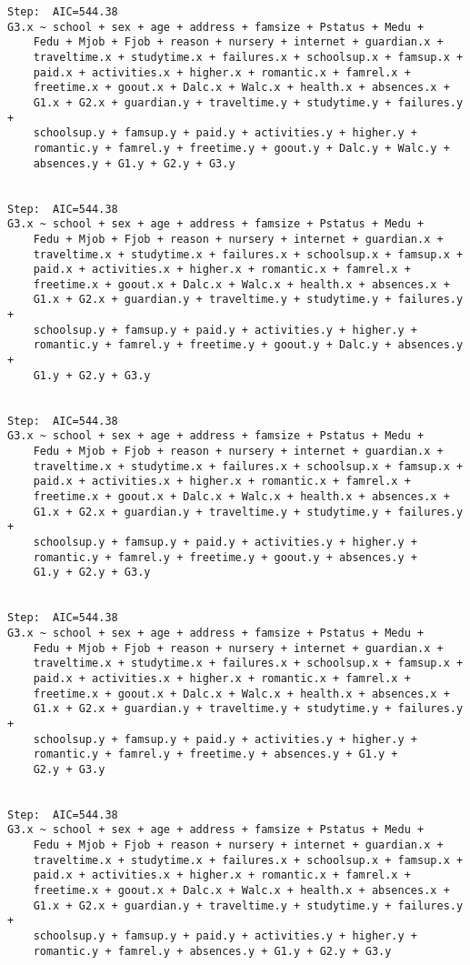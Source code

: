 \documentclass[11pt]{article}
\begin{document}
\begin{enumerate}
\begin{verbatim}
Step:  AIC=544.38
G3.x ~ school + sex + age + address + famsize + Pstatus + Medu + 
    Fedu + Mjob + Fjob + reason + nursery + internet + guardian.x + 
    traveltime.x + studytime.x + failures.x + schoolsup.x + famsup.x + 
    paid.x + activities.x + higher.x + romantic.x + famrel.x + 
    freetime.x + goout.x + Dalc.x + Walc.x + health.x + absences.x + 
    G1.x + G2.x + guardian.y + traveltime.y + studytime.y + failures.y + 
    schoolsup.y + famsup.y + paid.y + activities.y + higher.y + 
    romantic.y + famrel.y + freetime.y + goout.y + Dalc.y + Walc.y + 
    absences.y + G1.y + G2.y + G3.y


Step:  AIC=544.38
G3.x ~ school + sex + age + address + famsize + Pstatus + Medu + 
    Fedu + Mjob + Fjob + reason + nursery + internet + guardian.x + 
    traveltime.x + studytime.x + failures.x + schoolsup.x + famsup.x + 
    paid.x + activities.x + higher.x + romantic.x + famrel.x + 
    freetime.x + goout.x + Dalc.x + Walc.x + health.x + absences.x + 
    G1.x + G2.x + guardian.y + traveltime.y + studytime.y + failures.y + 
    schoolsup.y + famsup.y + paid.y + activities.y + higher.y + 
    romantic.y + famrel.y + freetime.y + goout.y + Dalc.y + absences.y + 
    G1.y + G2.y + G3.y


Step:  AIC=544.38
G3.x ~ school + sex + age + address + famsize + Pstatus + Medu + 
    Fedu + Mjob + Fjob + reason + nursery + internet + guardian.x + 
    traveltime.x + studytime.x + failures.x + schoolsup.x + famsup.x + 
    paid.x + activities.x + higher.x + romantic.x + famrel.x + 
    freetime.x + goout.x + Dalc.x + Walc.x + health.x + absences.x + 
    G1.x + G2.x + guardian.y + traveltime.y + studytime.y + failures.y + 
    schoolsup.y + famsup.y + paid.y + activities.y + higher.y + 
    romantic.y + famrel.y + freetime.y + goout.y + absences.y + 
    G1.y + G2.y + G3.y


Step:  AIC=544.38
G3.x ~ school + sex + age + address + famsize + Pstatus + Medu + 
    Fedu + Mjob + Fjob + reason + nursery + internet + guardian.x + 
    traveltime.x + studytime.x + failures.x + schoolsup.x + famsup.x + 
    paid.x + activities.x + higher.x + romantic.x + famrel.x + 
    freetime.x + goout.x + Dalc.x + Walc.x + health.x + absences.x + 
    G1.x + G2.x + guardian.y + traveltime.y + studytime.y + failures.y + 
    schoolsup.y + famsup.y + paid.y + activities.y + higher.y + 
    romantic.y + famrel.y + freetime.y + absences.y + G1.y + 
    G2.y + G3.y


Step:  AIC=544.38
G3.x ~ school + sex + age + address + famsize + Pstatus + Medu + 
    Fedu + Mjob + Fjob + reason + nursery + internet + guardian.x + 
    traveltime.x + studytime.x + failures.x + schoolsup.x + famsup.x + 
    paid.x + activities.x + higher.x + romantic.x + famrel.x + 
    freetime.x + goout.x + Dalc.x + Walc.x + health.x + absences.x + 
    G1.x + G2.x + guardian.y + traveltime.y + studytime.y + failures.y + 
    schoolsup.y + famsup.y + paid.y + activities.y + higher.y + 
    romantic.y + famrel.y + absences.y + G1.y + G2.y + G3.y



\end{verbatim}
\end{enumerate}
\end{document}
